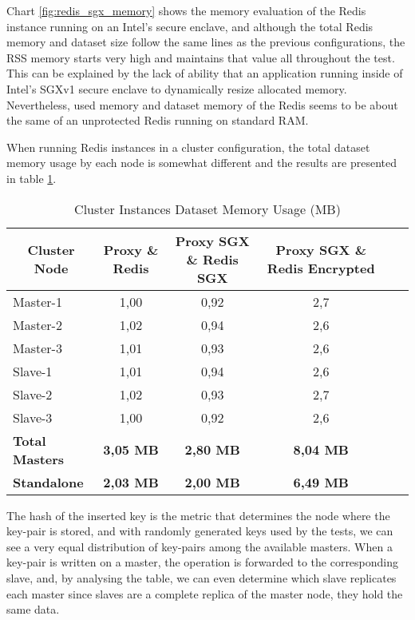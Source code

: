 Chart \ref{fig:redis_sgx_memory} shows the memory evaluation of the Redis instance running on an Intel's secure enclave, and although the total Redis memory and dataset size follow the same lines as the previous configurations, the \gls{RSS} memory starts very high and maintains that value all throughout the test. This can be explained by the lack of ability that an application running inside of Intel's \gls{SGX}v1 secure enclave to dynamically resize allocated memory. Nevertheless, used memory and dataset memory of the Redis seems to be about the same of an unprotected Redis running on standard \gls{RAM}.

When running Redis instances in a cluster configuration, the total dataset memory usage by each node is somewhat different and the results are presented in table \ref{tab:cluster_instances_dataset_memory_usage}.

\begin{table}[ht]
	\caption{Cluster Instances Dataset Memory Usage (MB)}
	\label{tab:cluster_instances_dataset_memory_usage}
\centering
\hspace*{-5mm}
\begin{tabular}{lccccc}
	\toprule
	\multicolumn{1}{c}{\textbf{Cluster Node}} & \multicolumn{1}{c}{\textbf{Proxy \& Redis}} & \textbf{Proxy SGX \& Redis SGX} & \textbf{Proxy SGX \& Redis Encrypted} \\
	\midrule
		Master-1 & 1,00 & 0,92 & 2,7 	\\
		Master-2 & 1,02 & 0,94 & 2,6 	\\
		Master-3 & 1,01 & 0,93 & 2,6 	\\
		Slave-1 & 1,01 & 0,94 & 2,6 		\\
		Slave-2 & 1,02 & 0,93 & 2,7 		\\
		Slave-3 & 1,00 & 0,92 & 2,6 		\\
	\midrule
	\textbf{Total Masters} & \textbf{3,05 MB} & \textbf{2,80 MB} & \textbf{8,04 MB}		\\
	\textbf{Standalone} & \textbf{2,03 MB} & \textbf{2,00 MB} & \textbf{6,49 MB} 		\\
	\bottomrule
\end{tabular}
\end{table}

The hash of the inserted key is the metric that determines the node where the key-pair is stored, and with randomly generated keys used by the tests, we can see a very equal distribution of key-pairs among the available masters. When a key-pair is written on a master, the operation is forwarded to the corresponding slave, and, by analysing the table, we can even determine which slave replicates each master since slaves are a complete replica of the master node, they hold the same data.

